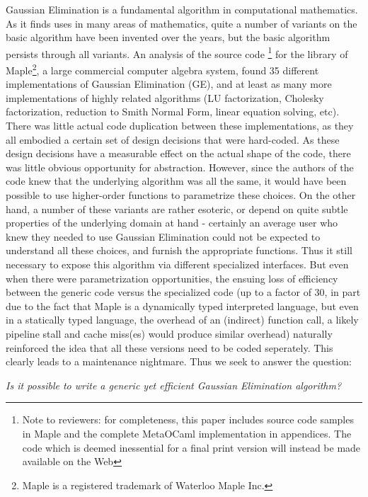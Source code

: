 \documentclass[11pt]{elsart}
\begin{document}
Gaussian Elimination is a fundamental algorithm in computational 
mathematics.  As it finds uses in many areas of mathematics, quite a
number of variants on the basic algorithm have been invented over
the years, but the basic algorithm persists through all variants.  
An analysis of the source code \footnote{Note to reviewers: for 
completeness, this paper includes source code samples in Maple
and the complete MetaOCaml implementation in appendices.  The
code which is deemed inessential for a final print version will
instead be made available on the Web}
for the library of Maple\footnote{Maple
is a registered trademark of Waterloo Maple Inc.}, a large
commercial computer algebra system, found 35 different implementations
of Gaussian Elimination (GE), and at least as many more implementations of
highly related algorithms (LU factorization, Cholesky factorization,
reduction to Smith Normal Form, linear equation solving, etc).  There
was little actual code duplication between these implementations, as they all
embodied a certain set of design decisions that were hard-coded.  As
these design decisions have a measurable effect on the actual shape of the
code, there was little obvious opportunity for abstraction.  However,
since the authors of the code knew that the underlying algorithm was
all the same, it would have been possible to use higher-order functions
to parametrize these choices.  On the other hand,
a number of these variants are rather esoteric, or depend on quite subtle
properties of the underlying domain at hand - certainly an average user
who knew they needed to use Gaussian Elimination could not be expected to
understand all these choices, and furnish the appropriate functions.
Thus it still necessary to expose this algorithm via different 
specialized interfaces.  But even when
there were parametrization opportunities, the ensuing loss of efficiency 
between the generic code versus the specialized code (up to a factor of 30,
in part due to the fact that Maple is a dynamically typed 
interpreted language, but even in a statically typed language, 
the overhead of an (indirect) function call, a likely pipeline stall
and cache miss(es) would produce similar overhead) 
naturally
reinforced the idea that all these versions need to be coded seperately.
This clearly leads to a maintenance nightmare.
Thus we seek to answer the question:
\begin{center}
\emph{Is it possible to write a generic yet efficient Gaussian Elimination
algorithm?}
\end{center}
\end{document}
